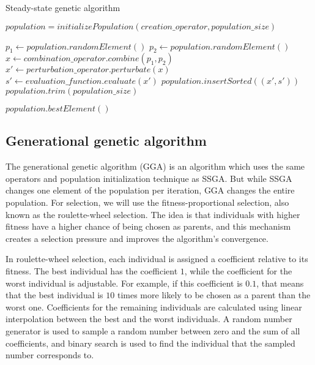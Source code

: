 \begin{algorithm}[!htbp]
    \caption{Steady-state genetic algorithm}
    \label{alg:ssga}

    $population = initializePopulation(creation\_operator, population\_size)$\;

     {
        $p_1 \gets population.randomElement()$\;
        $p_2 \gets population.randomElement()$\;
        $x \gets combination\_operator.combine(p_1, p_2)$\;
        $x' \gets perturbation\_operator.perturbate(x)$\;
        $s' \gets evaluation\_function.evaluate(x')$\;
        $population.insertSorted((x', s'))$\;
        $population.trim(population\_size)$\;
    }

    \Return $population.bestElement()$\;
    \end{algorithm}

\subsection{Generational genetic algorithm}
\label{sec:gga}

The generational genetic algorithm (GGA) \citep{gga} is an algorithm which uses the same operators and population initialization technique as SSGA. But while SSGA changes one element of the population per iteration, GGA changes the entire population. For selection, we will use the fitness-proportional selection, also known as the roulette-wheel selection. The idea is that individuals with higher fitness have a higher chance of being chosen as parents, and this mechanism creates a selection pressure and improves the algorithm's convergence.

In roulette-wheel selection, each individual is assigned a coefficient relative to its fitness. The best individual has the coefficient $1$, while the coefficient for the worst individual is adjustable. For example, if this coefficient is $0.1$, that means that the best individual is $10$ times more likely to be chosen as a parent than the worst one. Coefficients for the remaining individuals are calculated using linear interpolation between the best and the worst individuals. A random number generator is used to sample a random number between zero and the sum of all coefficients, and binary search is used to find the individual that the sampled number corresponds to.

